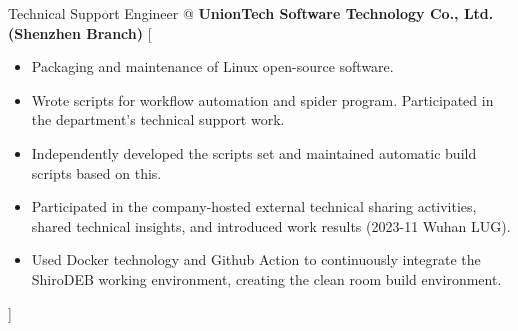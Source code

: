\documentclass[en]{resume}
\begin{document}


\begin{experiences}
    {Technical Support Engineer @ \textbf{UnionTech Software Technology Co., Ltd. (Shenzhen Branch)}}%
    [\begin{itemize}
		\item Packaging and maintenance of Linux open-source software.
		\item Wrote scripts for workflow automation and spider program. Participated in the department's technical support work.
		\item Independently developed the  scripts set and maintained automatic build scripts based on this.
		\item Participated in the company-hosted external technical sharing activities, shared technical insights, and introduced work results (2023-11 Wuhan LUG).
		\item Used Docker technology and Github Action to continuously integrate the ShiroDEB working environment, creating the clean room build environment.
    \end{itemize}]
\end{experiences}
\end{document}
